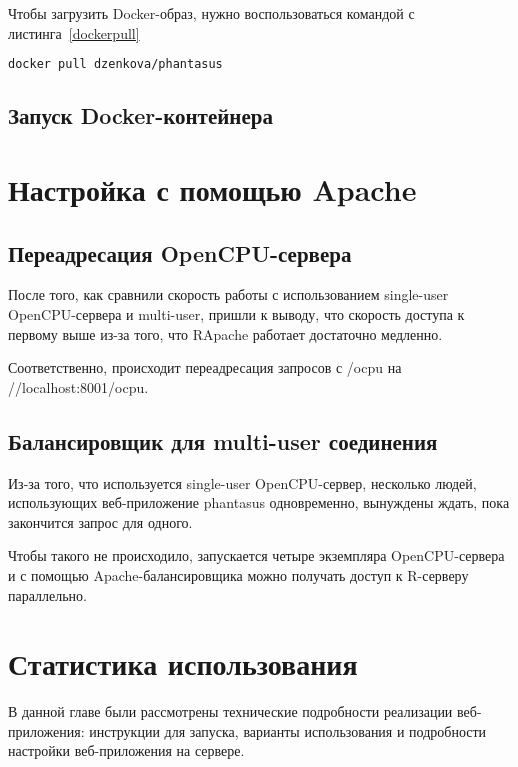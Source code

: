 Чтобы загрузить Docker-образ, нужно воспользоваться командой с листинга~\ref{dockerpull}
\begin{lstlisting}[float=!h,language=bash,label={dockerpull},caption={Загрузка Docker-образа phantasus}]
  docker pull dzenkova/phantasus
\end{lstlisting}

\subsection{Запуск Docker-контейнера}

\section{Настройка с помощью Apache}
\subsection{Переадресация OpenCPU-сервера}
После того, как сравнили скорость работы с использованием single-user OpenCPU-сервера и multi-user, пришли к выводу, что скорость доступа к первому выше из-за того, что RApache работает достаточно медленно.

Соответственно, происходит переадресация запросов с /ocpu на //localhost:8001/ocpu.
\subsection{Балансировщик для multi-user соединения}
Из-за того, что используется single-user OpenCPU-сервер, несколько людей, использующих веб-приложение phantasus одновременно, вынуждены ждать, пока закончится запрос для одного.

Чтобы такого не происходило, запускается четыре экземпляра OpenCPU-сервера и с помощью Apache-балансировщика можно получать доступ к R-серверу параллельно.

\section{Статистика использования}

\chapterconclusion
В данной главе были рассмотрены технические подробности реализации веб-приложения: инструкции для запуска, варианты использования и подробности настройки веб-приложения на сервере.

